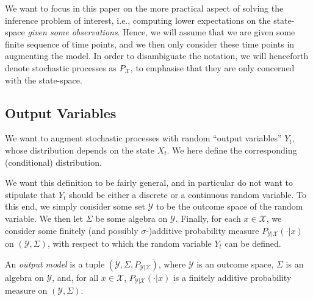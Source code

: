 \documentclass[twoside,11pt]{article}
\newcommand{\states}{\mathcal{X}}
\newcommand{\observs}{\mathcal{Y}}
\begin{document}
We want to focus in this paper on the more practical aspect of solving the inference problem of interest, i.e., computing lower expectations on the state-space \emph{given some observations}. %
Hence, we will assume that we are given some finite sequence of time points, and we then only consider these time points in augmenting the model.
In order to disambiguate the notation, we will henceforth denote stochastic processes as $P_\states$, to emphasise that they are only concerned with the state-space. %

\subsection{Output Variables}\label{sec:observs}

We want to augment stochastic processes with random ``output variables'' $Y_t$, whose distribution depends on the state $X_t$. We here define the corresponding (conditional) distribution.

We want this definition to be fairly general, and in particular do not want to stipulate that $Y_t$ should be either a discrete or a continuous random variable. To this end, we simply consider some set $\observs$ to be the outcome space of the random variable. We then let $\Sigma$ be some algebra on $\observs$. Finally, for each $x\in\states$, we consider some finitely (and possibly $\sigma$-)additive probability measure $P_{\observs\vert\states}(\cdot\vert x)$ on $(\observs,\Sigma)$, with respect to which the random variable $Y_t$ can be defined.

\begin{definition}
An \emph{output model} is a tuple $(\observs,\Sigma,P_{\observs\vert \states})$, where $\observs$ is an outcome space, $\Sigma$ is an algebra on $\observs$, and, for all $x\in\states$, $P_{\observs\vert\states}(\cdot\vert x)$ is a finitely additive probability measure on $(\observs,\Sigma)$.
\end{definition}
\end{document}
